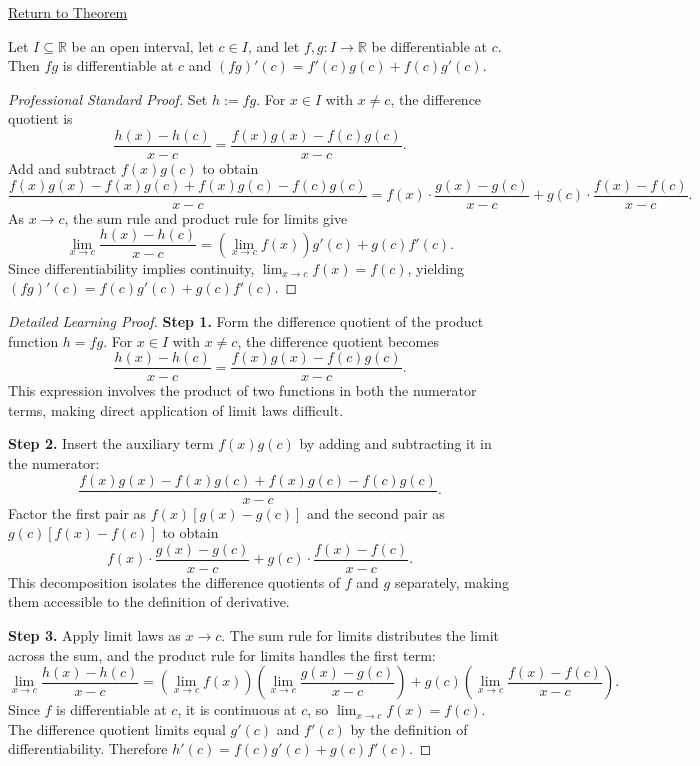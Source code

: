\newpage
{}
\label{prf:product-rule}

\begin{remark*}[Return]
\hyperref[thm:product-rule]{Return to Theorem}
\end{remark*}

\begin{theorem*}
Let $I \subseteq \mathbb{R}$ be an open interval, let $c \in I$, and let $f, g : I \to \mathbb{R}$ be differentiable at $c$. Then $fg$ is differentiable at $c$ and $(fg)'(c) = f'(c)g(c) + f(c)g'(c)$.
\end{theorem*}

\begin{proof}[Professional Standard Proof]
\LRAProofBodyStart
Set $h := fg$. For $x \in I$ with $x \neq c$, the difference quotient is
\[
  \frac{h(x) - h(c)}{x - c} = \frac{f(x)g(x) - f(c)g(c)}{x - c}.
\]
Add and subtract $f(x)g(c)$ to obtain
\[
  \frac{f(x)g(x) - f(x)g(c) + f(x)g(c) - f(c)g(c)}{x - c}
  = f(x) \cdot \frac{g(x) - g(c)}{x - c} + g(c) \cdot \frac{f(x) - f(c)}{x - c}.
\]
As $x \to c$, the sum rule and product rule for limits give
\[
  \lim_{x \to c} \frac{h(x) - h(c)}{x - c}
  = \left(\lim_{x \to c} f(x)\right) g'(c) + g(c) f'(c).
\]
Since differentiability implies continuity, $\lim_{x \to c} f(x) = f(c)$, yielding $(fg)'(c) = f(c)g'(c) + g(c)f'(c)$.
\end{proof}

\begin{proof}[Detailed Learning Proof]
\LRAProofBodyStart

\textbf{Step 1.} Form the difference quotient of the product function $h = fg$. For $x \in I$ with $x \neq c$, the difference quotient becomes
\[
  \frac{h(x) - h(c)}{x - c} = \frac{f(x)g(x) - f(c)g(c)}{x - c}.
\]
This expression involves the product of two functions in both the numerator terms, making direct application of limit laws difficult.

\textbf{Step 2.} Insert the auxiliary term $f(x)g(c)$ by adding and subtracting it in the numerator:
\[
  \frac{f(x)g(x) - f(x)g(c) + f(x)g(c) - f(c)g(c)}{x - c}.
\]
Factor the first pair as $f(x)[g(x) - g(c)]$ and the second pair as $g(c)[f(x) - f(c)]$ to obtain
\[
  f(x) \cdot \frac{g(x) - g(c)}{x - c} + g(c) \cdot \frac{f(x) - f(c)}{x - c}.
\]
This decomposition isolates the difference quotients of $f$ and $g$ separately, making them accessible to the definition of derivative.

\textbf{Step 3.} Apply limit laws as $x \to c$. The sum rule for limits distributes the limit across the sum, and the product rule for limits handles the first term:
\[
  \lim_{x \to c} \frac{h(x) - h(c)}{x - c} = \left(\lim_{x \to c} f(x)\right)\left(\lim_{x \to c} \frac{g(x) - g(c)}{x - c}\right) + g(c)\left(\lim_{x \to c} \frac{f(x) - f(c)}{x - c}\right).
\]
Since $f$ is differentiable at $c$, it is continuous at $c$, so $\lim_{x \to c} f(x) = f(c)$. The difference quotient limits equal $g'(c)$ and $f'(c)$ by the definition of differentiability. Therefore $h'(c) = f(c)g'(c) + g(c)f'(c)$.
\end{proof}

